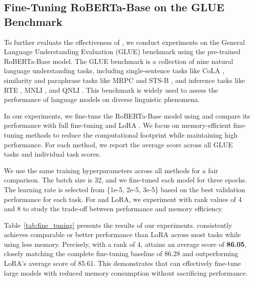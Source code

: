\vspace{-2mm}

\subsection{Fine-Tuning RoBERTa-Base on the GLUE Benchmark}

To further evaluate the effectiveness of \textit{\lowrank}, we conduct experiments on the General Language Understanding Evaluation (GLUE) benchmark using the pre-trained RoBERTa-Base model. The GLUE benchmark is a collection of nine natural language understanding tasks, including single-sentence tasks like CoLA \citep{warstadt2019neural}, similarity and paraphrase tasks like MRPC \citep{dolan2005automatically} and STS-B \citep{cer2017semeval}, and inference tasks like RTE \citep{dagan2005pascal}, MNLI \citep{williams2018broad}, and QNLI \citep{rajpurkar2016squad}. This benchmark is widely used to assess the performance of language models on diverse linguistic phenomena.

In our experiments, we fine-tune the RoBERTa-Base model using \textit{\lowrank} and compare its performance with full fine-tuning and LoRA \citep{huLoRALowRankAdaptation2021}. We focus on memory-efficient fine-tuning methods to reduce the computational footprint while maintaining high performance. For each method, we report the average score across all GLUE tasks and individual task scores.

We use the same training hyperparameters across all methods for a fair comparison. The batch size is 32, and we fine-tuned each model for three epochs. The learning rate is selected from \{1e-5, 2e-5, 3e-5\} based on the best validation performance for each task. For \textit{\lowrank} and LoRA, we experiment with rank values of 4 and 8 to study the trade-off between performance and memory efficiency.

Table~\ref{tab:fine_tuning} presents the results of our experiments. \textit{\lowrank} consistently achieves comparable or better performance than LoRA across most tasks while using less memory. Precisely, with a rank of 4, \textit{\lowrank} attains an average score of \textbf{86.05}, closely matching the complete fine-tuning baseline of 86.28 and outperforming LoRA's average score of 85.61. This demonstrates that \textit{\lowrank} can effectively fine-tune large models with reduced memory consumption without sacrificing performance.



